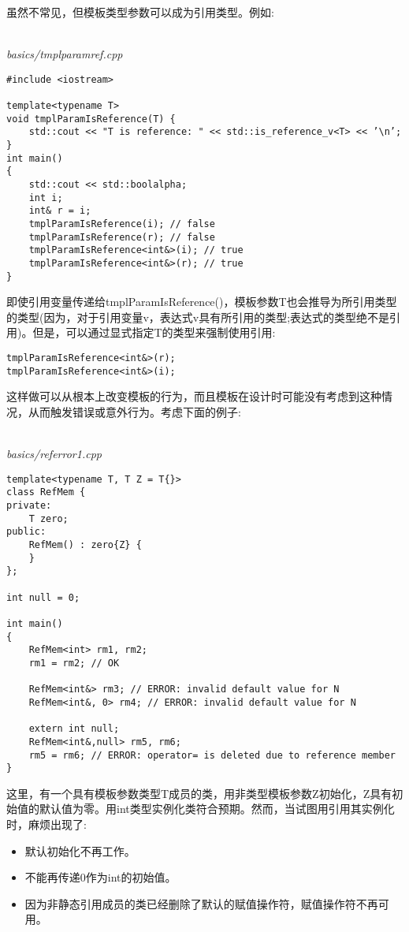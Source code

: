 虽然不常见，但模板类型参数可以成为引用类型。例如:

\hspace*{\fill} \\ %
\noindent
\textit{basics/tmplparamref.cpp}
\begin{lstlisting}[style=styleCXX]
#include <iostream>

template<typename T>
void tmplParamIsReference(T) {
	std::cout << "T is reference: " << std::is_reference_v<T> << ’\n’;
}
int main()
{
	std::cout << std::boolalpha;
	int i;
	int& r = i;
	tmplParamIsReference(i); // false
	tmplParamIsReference(r); // false
	tmplParamIsReference<int&>(i); // true
	tmplParamIsReference<int&>(r); // true
}
\end{lstlisting}

即使引用变量传递给tmplParamIsReference()，模板参数T也会推导为所引用类型的类型(因为，对于引用变量v，表达式v具有所引用的类型;表达式的类型绝不是引用)。但是，可以通过显式指定T的类型来强制使用引用:

\begin{lstlisting}[style=styleCXX]
tmplParamIsReference<int&>(r);
tmplParamIsReference<int&>(i);
\end{lstlisting}

这样做可以从根本上改变模板的行为，而且模板在设计时可能没有考虑到这种情况，从而触发错误或意外行为。考虑下面的例子:

\hspace*{\fill} \\ %
\noindent
\textit{basics/referror1.cpp}
\begin{lstlisting}[style=styleCXX]
template<typename T, T Z = T{}>
class RefMem {
private:
	T zero;
public:
	RefMem() : zero{Z} {
	}
};

int null = 0;

int main()
{
	RefMem<int> rm1, rm2;
	rm1 = rm2; // OK

	RefMem<int&> rm3; // ERROR: invalid default value for N
	RefMem<int&, 0> rm4; // ERROR: invalid default value for N

	extern int null;
	RefMem<int&,null> rm5, rm6;
	rm5 = rm6; // ERROR: operator= is deleted due to reference member
}
\end{lstlisting}

这里，有一个具有模板参数类型T成员的类，用非类型模板参数Z初始化，Z具有初始值的默认值为零。用int类型实例化类符合预期。然而，当试图用引用其实例化时，麻烦出现了:

\begin{itemize}
\item
默认初始化不再工作。

\item
不能再传递0作为int的初始值。

\item
因为非静态引用成员的类已经删除了默认的赋值操作符，赋值操作符不再可用。
\end{itemize}

